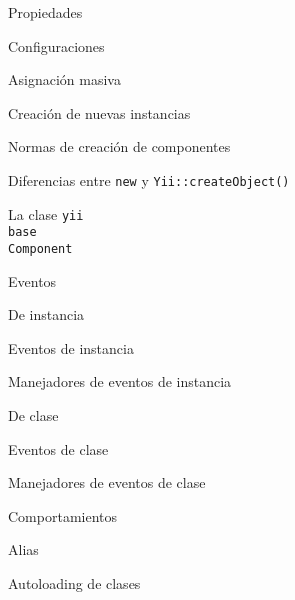 \begin{longenum}
\begin{longenum}
\begin{longenum}
\begin{longenum}
                \begin{longenum}
                    \item Propiedades
                    \item Configuraciones
                    \begin{longenum}
                        \item Asignación masiva
                        \item Creación de nuevas instancias
                        \item Normas de creación de componentes
                        \item Diferencias entre \texttt{new} y \texttt{Yii::createObject()}
                    \end{longenum}
                \end{longenum}
                \item La clase \texttt{yii\\base\\Component}
                \begin{longenum}
                    \item Eventos
                    \begin{longenum}
                        \item De instancia
                        \begin{longenum}
                            \item Eventos de instancia
                            \item Manejadores de eventos de instancia
                        \end{longenum}
                        \item De clase
                        \begin{longenum}
                            \item Eventos de clase
                            \item Manejadores de eventos de clase
                        \end{longenum}
                    \end{longenum}
                    \item Comportamientos
                \end{longenum}
            \end{longenum}
            \item Alias
            \item Autoloading de clases

\end{longenum}
\end{longenum}
\end{longenum}
